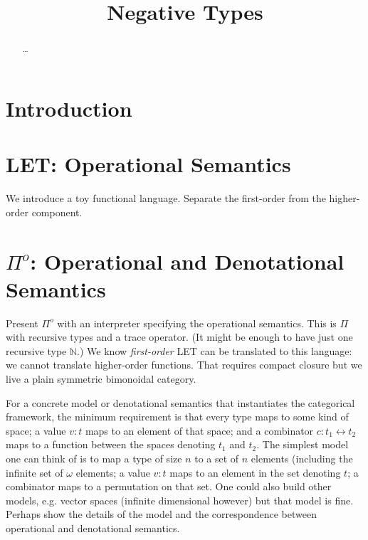 \documentclass[authoryear,preprint]{sigplanconf}
\begin{document}
\lstset{breaklines=true, breakatwhitespace=true}
\lstset{numbers=none, numbersep=5pt, stepnumber=2, numberstyle=\scriptsize}
\lstset{rangeprefix=/*!\ , rangesuffix=\ !*\/, includerangemarker=false}

\title{Negative Types}
\authorinfo{}{}{}
\maketitle

\begin{abstract}
\ldots
\end{abstract}

\section{Introduction}

\section{\textsc{LET}: Operational Semantics}

We introduce a toy functional language. Separate the first-order from the
higher-order component.

\section{$\Pi^{o}$: Operational and Denotational Semantics}

Present $\Pi^{o}$ with an interpreter specifying the operational
semantics. This is $\Pi$ with recursive types and a trace operator. (It might
be enough to have just one recursive type $\mathbb{N}$.) We know
\emph{first-order} \textsc{LET} can be translated to this language: we cannot
translate higher-order functions. That requires compact closure but we live a
plain symmetric bimonoidal category.

For a concrete model or denotational semantics that instantiates the
categorical framework, the minimum requirement is that every type maps to
some kind of space; a value $v : t$ maps to an element of that space; and a
combinator $c : t_1 \leftrightarrow t_2$ maps to a function between the
spaces denoting $t_1$ and $t_2$. The simplest model one can think of is to
map a type of size $n$ to a set of $n$ elements (including the infinite set
of $\omega$ elements; a value $v : t$ maps to an element in the set denoting
$t$; a combinator maps to a permutation on that set. One could also build
other models, e.g. vector spaces (infinite dimensional however) but that
model is fine. Perhaps show the details of the model and the correspondence
between operational and denotational semantics.
\end{document}
